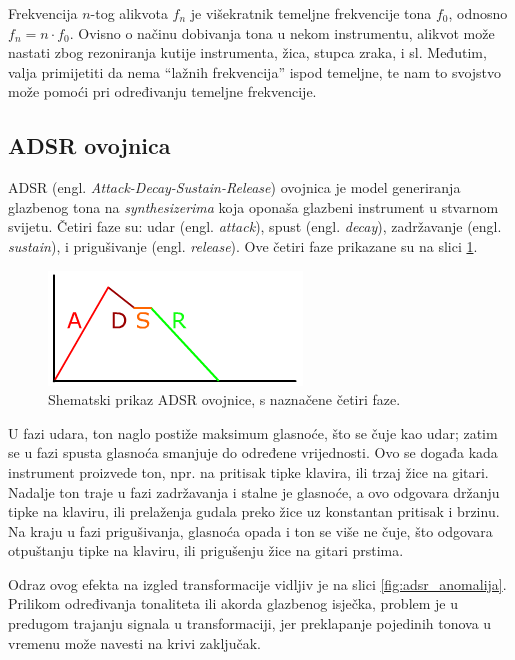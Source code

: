 \documentclass[a4paper, 11pt, twocolumn]{article}
\begin{document}
Frekvencija $n$-tog alikvota $f_n$ je višekratnik temeljne frekvencije tona $f_0$, odnosno $f_n = n \cdot f_0$.
Ovisno o načinu dobivanja tona u nekom instrumentu, alikvot može nastati zbog rezoniranja kutije instrumenta, žica, stupca zraka, i sl.
Međutim, valja primijetiti da nema ``lažnih frekvencija'' ispod temeljne, te nam to svojstvo može pomoći pri određivanju temeljne frekvencije.

\subsection{ADSR ovojnica}
\label{ss:adsr}
ADSR (engl. \textit{Attack-Decay-Sustain-Release}) ovojnica je model generiranja glazbenog tona na \textit{synthesizerima} koja oponaša glazbeni instrument u stvarnom svijetu.
Četiri faze su: udar (engl. \textit{attack}), spust (engl. \textit{decay}), zadržavanje (engl. \textit{sustain}), i prigušivanje (engl. \textit{release}).
Ove četiri faze prikazane su na slici \ref{fig:adsr}.

\begin{figure}[htb]
  \includegraphics[width=\linewidth]{Adsr3}
  \caption{Shematski prikaz ADSR ovojnice, s naznačene četiri faze.}
  \label{fig:adsr}
\end{figure}

U fazi udara, ton naglo postiže maksimum glasnoće, što se čuje kao udar;
zatim se u fazi spusta glasnoća smanjuje do određene vrijednosti.
Ovo se događa kada instrument proizvede ton, npr. na pritisak tipke klavira, ili trzaj žice na gitari.
Nadalje ton traje u fazi zadržavanja i stalne je glasnoće, a ovo odgovara držanju tipke na klaviru, ili prelaženja gudala preko žice uz konstantan pritisak i brzinu.
Na kraju u fazi prigušivanja, glasnoća opada i ton se više ne čuje, što odgovara otpuštanju tipke na klaviru, ili prigušenju žice na gitari prstima.

Odraz ovog efekta na izgled transformacije vidljiv je na slici \ref{fig:adsr_anomalija}.
Prilikom određivanja tonaliteta ili akorda glazbenog isječka, problem je u predugom trajanju signala u transformaciji, jer preklapanje pojedinih tonova u vremenu može navesti na krivi zaključak.
\end{document}
